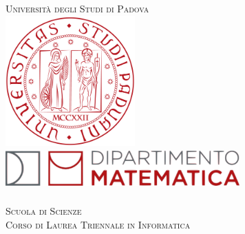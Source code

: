 \begin{titlepage}
    
    \newcommand{\HRule}{\rule{\linewidth}{0.5mm}} 
    
    \center
    
    
    \textsc{\LARGE Università degli Studi di Padova}\\[1cm] 
    
    
    \includegraphics[height=5cm]{img/UniPd.png}\\[1cm]
    
    \includegraphics[height=1.5cm, width = 9cm]{img/MathDip.png}\\
    \textsc{\dipartimento}\\[1.2cm]
    \textsc{\Large Scuola di Scienze}\\[0.5cm] 
    
    \textsc{\large Corso di Laurea Triennale in Informatica}\\[0.5cm] 
    
    \vspace{2.5cm}
    
    

\end{titlepage}
